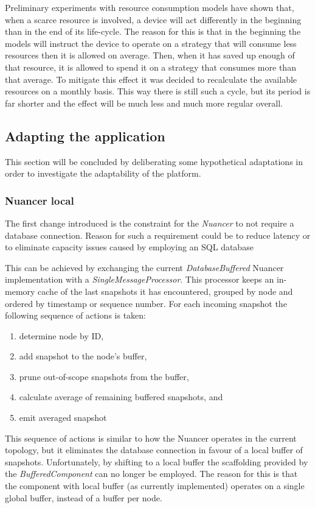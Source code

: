 Preliminary experiments with resource consumption models have shown that, when a scarce resource is involved, a device will act differently in the beginning than in the end of its life-cycle. The reason for this is that in the beginning the models will instruct the device to operate on a strategy that will consume less resources then it is allowed on average. Then, when it has saved up enough of that resource, it is allowed to spend it on a strategy that consumes more than that average. To mitigate this effect it was decided to recalculate the available resources on a monthly basis. This way there is still such a cycle, but its period is far shorter and the effect will be much less and much more regular overall.

\subsection{Adapting the application}
This section will be concluded by deliberating some hypothetical adaptations in order to investigate the adaptability of the platform.

\subsubsection{Nuancer local}
The first change introduced is the constraint for the \emph{Nuancer} to not require a database connection. Reason for such a requirement could be to reduce latency or to eliminate capacity issues caused by employing an SQL database

This can be achieved by exchanging the current \emph{DatabaseBuffered} Nuancer implementation with a \emph{SingleMessageProcessor}. This processor keeps an in-memory cache of the last snapshots it has encountered, grouped by node and ordered by timestamp or sequence number. For each incoming snapshot the following sequence of actions is taken:
\begin{enumerate}
\nospace
\item determine node by ID,
\item add snapshot to the node's buffer,
\item prune out-of-scope snapshots from the buffer,
\item calculate average of remaining buffered snapshots, and
\item emit averaged snapshot
\end{enumerate}
This sequence of actions is similar to how the Nuancer operates in the current topology, but it eliminates the database connection in favour of a local buffer of snapshots. Unfortunately, by shifting to a local buffer the scaffolding provided by the \emph{BufferedComponent} can no longer be employed. The reason for this is that the component with local buffer (as currently implemented) operates on a single global buffer, instead of a buffer per node.

